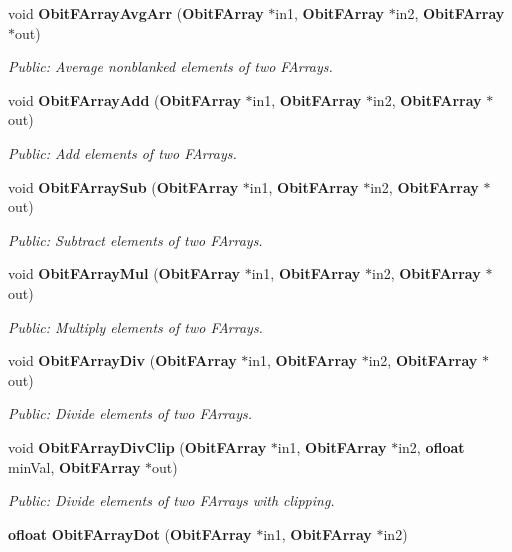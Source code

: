 \begin{CompactItemize}
void {\bf Obit\-FArray\-Avg\-Arr} ({\bf Obit\-FArray} $\ast$in1, {\bf Obit\-FArray} $\ast$in2, {\bf Obit\-FArray} $\ast$out)
\begin{CompactList}\small\item\em Public: Average nonblanked elements of two FArrays. \item\end{CompactList}\item 
void {\bf Obit\-FArray\-Add} ({\bf Obit\-FArray} $\ast$in1, {\bf Obit\-FArray} $\ast$in2, {\bf Obit\-FArray} $\ast$out)
\begin{CompactList}\small\item\em Public: Add elements of two FArrays. \item\end{CompactList}\item 
void {\bf Obit\-FArray\-Sub} ({\bf Obit\-FArray} $\ast$in1, {\bf Obit\-FArray} $\ast$in2, {\bf Obit\-FArray} $\ast$out)
\begin{CompactList}\small\item\em Public: Subtract elements of two FArrays. \item\end{CompactList}\item 
void {\bf Obit\-FArray\-Mul} ({\bf Obit\-FArray} $\ast$in1, {\bf Obit\-FArray} $\ast$in2, {\bf Obit\-FArray} $\ast$out)
\begin{CompactList}\small\item\em Public: Multiply elements of two FArrays. \item\end{CompactList}\item 
void {\bf Obit\-FArray\-Div} ({\bf Obit\-FArray} $\ast$in1, {\bf Obit\-FArray} $\ast$in2, {\bf Obit\-FArray} $\ast$out)
\begin{CompactList}\small\item\em Public: Divide elements of two FArrays. \item\end{CompactList}\item 
void {\bf Obit\-FArray\-Div\-Clip} ({\bf Obit\-FArray} $\ast$in1, {\bf Obit\-FArray} $\ast$in2, {\bf ofloat} min\-Val, {\bf Obit\-FArray} $\ast$out)
\begin{CompactList}\small\item\em Public: Divide elements of two FArrays with clipping. \item\end{CompactList}\item 
{\bf ofloat} {\bf Obit\-FArray\-Dot} ({\bf Obit\-FArray} $\ast$in1, {\bf Obit\-FArray} $\ast$in2)

\end{CompactItemize}
